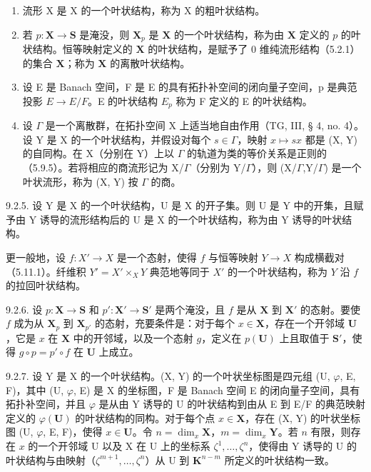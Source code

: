 \begin{enumerate}
\def\labelenumi{\alph{enumi})}
\item
  流形 X 是 X 的一个叶状结构，称为 X 的粗叶状结构。
\item
  若 \(p: \mathbf{X} \to \mathbf{S}\) 是淹没，则 \(\mathbf{X}_p\) 是 \(\mathbf{X}\) 的一个叶状结构，称为由 \(\mathbf{X}\) 定义的 \(p\) 的叶状结构。恒等映射定义的 \(\mathbf{X}\) 的叶状结构，是赋予了 0 维纯流形结构（5.2.1）的集合 \(\mathbf{X}\)；称为 \(\mathbf{X}\) 的离散叶状结构。
\item
  设 E 是 Banach 空间，F 是 E 的具有拓扑补空间的闭向量子空间，p 是典范投影 \(E \rightarrow E/F\)。E 的叶状结构 \(E_{p}\) 称为 F 定义的 E 的叶状结构。
\item
  设 \(\Gamma\) 是一个离散群，在拓扑空间 X 上适当地自由作用（TG, III, § 4, no. 4）。设 Y 是 X 的一个叶状结构，并假设对每个 \(s \in \Gamma\)，映射 \(x \mapsto sx\) 都是 (X, Y) 的自同构。在 X（分别在 Y）上以 \(\Gamma\) 的轨道为类的等价关系是正则的（5.9.5）。若将相应的商流形记为 X/\(\Gamma\)（分别为 Y/\(\Gamma\)），则 (X/\(\Gamma\),Y/\(\Gamma\)) 是一个叶状流形，称为 (X, Y) 按 \(\Gamma\) 的商。
\end{enumerate}

9.2.5. 设 Y 是 X 的一个叶状结构，U 是 X 的开子集。则 U 是 Y 中的开集，且赋予由 Y 诱导的流形结构后的 U 是 X 的一个叶状结构，称为由 Y 诱导的叶状结构。

更一般地，设 \(f: X' \to X\) 是一个态射，使得 \(f\) 与恒等映射 \(Y \to X\) 构成横截对（5.11.1）。纤维积 \(Y' = X' \times_X Y\) 典范地等同于 \(X'\) 的一个叶状结构，称为 \(Y\) 沿 \(f\) 的拉回叶状结构。

9.2.6. 设 \(p: \mathbf{X} \to \mathbf{S}\) 和 \(p': \mathbf{X}' \to \mathbf{S}'\) 是两个淹没，且 \(f\) 是从 \(\mathbf{X}\) 到 \(\mathbf{X}'\) 的态射。要使 \(f\) 成为从 \(\mathbf{X}_p\) 到 \(\mathbf{X}_{p'}\) 的态射，充要条件是：对于每个 \(x \in \mathbf{X}\)，存在一个开邻域 \(\mathbf{U}\)，它是 \(x\) 在 \(\mathbf{X}\) 中的开邻域，以及一个态射 \(g\)，定义在 \(p(\mathbf{U})\) 上且取值于 \(\mathbf{S}'\)，使得 \(g \circ p = p' \circ f\) 在 \(\mathbf{U}\) 上成立。

9.2.7. 设 Y 是 X 的一个叶状结构。(X, Y) 的一个叶状坐标图是四元组 (U, \(\varphi\), E, F)，其中 (U, \(\varphi\), E) 是 X 的坐标图，F 是 Banach 空间 E 的闭向量子空间，具有拓扑补空间，并且 \(\varphi\) 是从由 Y 诱导的 U 的叶状结构到由从 E 到 E/F 的典范映射定义的 \(\varphi(\mathbf{U})\) 的叶状结构的同构。对于每个点 \(x \in \mathbf{X}\)，存在 (X, Y) 的叶状坐标图 (U, \(\varphi\), E, F)，使得 \(x \in \mathbf{U}\)。令 \(n = \dim_x \mathbf{X}\)，\(m = \dim_x \mathbf{Y}\)。若 \(n\) 有限，则存在 \(x\) 的一个开邻域 U 以及 X 在 U 上的坐标系 \(\zeta^1, \ldots, \zeta^n\)，使得由 Y 诱导的 U 的叶状结构与由映射（\(\zeta^{m+1}, \ldots, \zeta^n\)）从 U 到 \(\mathbf{K}^{n-m}\) 所定义的叶状结构一致。

